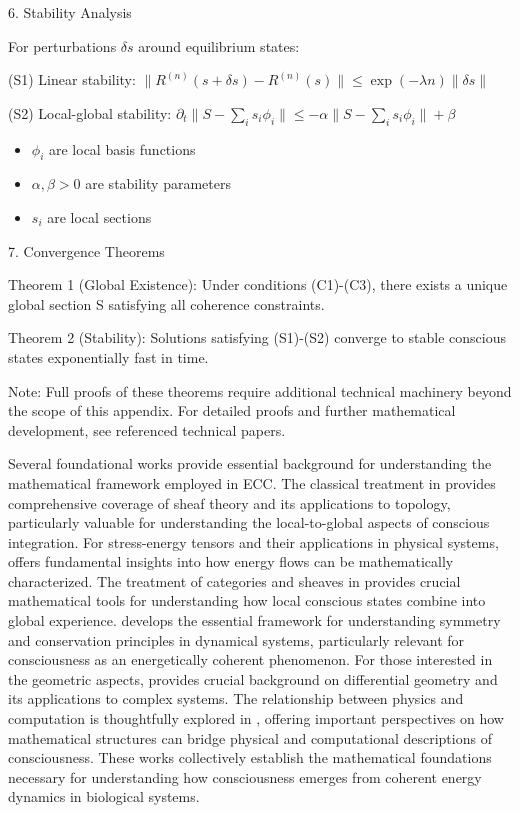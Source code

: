 6. Stability Analysis

For perturbations $\delta s$ around equilibrium states:

(S1) Linear stability:
$\|R^{(n)}(s + \delta s) - R^{(n)}(s)\| \leq \exp(-\lambda n)\|\delta s\|$

(S2) Local-global stability:
$\partial_t\|S - \sum_i s_i\phi_i\| \leq -\alpha\|S - \sum_i s_i\phi_i\| + \beta$

\begin{itemize}
\item $\phi_i$ are local basis functions
\item $\alpha,\beta > 0$ are stability parameters
\item $s_i$ are local sections
\end{itemize}

7. Convergence Theorems

Theorem 1 (Global Existence): Under conditions (C1)-(C3), there exists a unique global section S satisfying all coherence constraints.

Theorem 2 (Stability): Solutions satisfying (S1)-(S2) converge to stable conscious states exponentially fast in time.

Note: Full proofs of these theorems require additional technical machinery beyond the scope of this appendix. For detailed proofs and further mathematical development, see referenced technical papers.

Several foundational works provide essential background for understanding the mathematical framework employed in ECC. The classical treatment in \cite{bredon1997sheaf} provides comprehensive coverage of sheaf theory and its applications to topology, particularly valuable for understanding the local-to-global aspects of conscious integration. For stress-energy tensors and their applications in physical systems, \cite{misner2017gravitation} offers fundamental insights into how energy flows can be mathematically characterized. The treatment of categories and sheaves in \cite{kashiwara2006categories} provides crucial mathematical tools for understanding how local conscious states combine into global experience. \cite{marsden2013introduction} develops the essential framework for understanding symmetry and conservation principles in dynamical systems, particularly relevant for consciousness as an energetically coherent phenomenon. For those interested in the geometric aspects, \cite{wells2008differential} provides crucial background on differential geometry and its applications to complex systems. The relationship between physics and computation is thoughtfully explored in \cite{baez2011physics}, offering important perspectives on how mathematical structures can bridge physical and computational descriptions of consciousness. These works collectively establish the mathematical foundations necessary for understanding how consciousness emerges from coherent energy dynamics in biological systems.